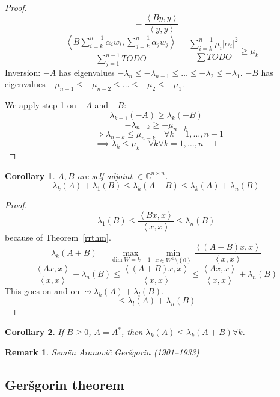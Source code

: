 \documentclass{article}
\newtheorem{remark}{Remark}  \numberwithin{remark}{section}
\newtheorem{corollary}{Corollary}  \numberwithin{corollary}{section}
\newcommand{\set}[1]{\left\{#1\right\}}
\newcommand{\angel}[1]{\left\langle#1\right\rangle}
\newcommand{\card}[1]{\left|#1\right|}
\begin{document}
\begin{proof}
\[    = \frac{\angel{By, y}}{\angel{y, y}}
  \] \[
    = \frac{\angel{B \sum_{i=k}^{n-1} \alpha_i w_i, \sum_{j=k}^{n-1} \alpha_j w_j}}{\sum_{j=1}^{n-1} TODO}
    = \frac{\sum_{i=k}^{n-1} \mu_i \card{\alpha_i}^2}{\sum TODO} \geq \mu_k
  \]
  Inversion:
  $-A$ has eigenvalues $-\lambda_n \leq -\lambda_{n-1} \leq \dots \leq -\lambda_2 \leq -\lambda_1$.
  $-B$ has eigenvalues $-\mu_{n-1} \leq -\mu_{n-2} \leq \dots \leq -\mu_2 \leq -\mu_1$.

  We apply step 1 on $-A$ and $-B$:
  \[ \lambda_{k+1} (-A) \geq \lambda_k (-B) \]
  \[ -\lambda_{n-k} \geq -\mu_{n-k} \]
  \[ \implies \lambda_{n-k} \leq \mu_{n-k} \quad \forall k = 1, \dots, n-1 \]
  \[ \implies \lambda_k \leq \mu_k \quad \forall k \forall k = 1, \dots, n-1 \]
\end{proof}

\begin{corollary} %
  \label{col138}
  $A, B$ are self-adjoint $\in \mathbb C^{n \times n}$.
  \[ \lambda_{k}(A) + \lambda_1(B) \leq \lambda_k(A + B) \leq \lambda_k(A) + \lambda_n(B) \]
\end{corollary}
\begin{proof}
  \[ \lambda_1(B) \leq \frac{\angel{Bx, x}}{\angel{x, x}} \leq \lambda_n(B) \]
  because of Theorem~\ref{rrthm}.
  \[ \lambda_k(A + B) = \max_{\dim{W}=k-1} \min_{x \in W^\bot \setminus \set{0}} \frac{\angel{(A + B)x, x}}{\angel{x, x}} \]
  \[ \frac{\angel{Ax, x}}{\angel{x, x}} + \lambda_n(B) \leq \frac{\angel{(A + B)x, x}}{\angel{x, x}} \leq \frac{\angel{Ax, x}}{\angel{x, x}} + \lambda_n(B) \]
  This goes on and on $\leadsto \lambda_k(A) + \lambda_l(B)$.
  \[ \leq \lambda_l(A) + \lambda_n(B) \]
\end{proof}

\begin{corollary} %
  If $B \geq 0$, $A = A^*$, then $\lambda_k(A) \leq \lambda_k(A + B) \forall k$.
\end{corollary}

\begin{remark}
  Sem\"en Aranovi\v{c} Ger\v{s}gorin (1901--1933)
\end{remark}

\subsection{Ger\v{s}gorin theorem}
\end{document}
